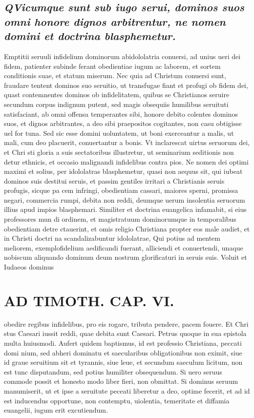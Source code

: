 \documentclass{article}
\begin{document}
\begin{pages}
\subsection*{\textit{\huge\textbf{Q}\normalsize Vicumque sunt sub iugo serui, dominos suos omni honore dignos arbitrentur, ne nomen domini et doctrina blasphemetur. }}\pstart Emptitii seruuli infidelium dominorum abidololatria conuersi, ad unius ueri dei fidem, patienter subinde ferant obedientiae iugum ac laborem, et sortem conditionis suae, et statum miserum. Nec quia ad Christum conuersi sunt, fraudare tentent dominos suo seruitio, ut transfugae fiant et profugi ob fidem dei, quast contemnentes dominos ob infidelitatem, quibus se Christianos seruire secundum corpus indignum putent, sed magis obsequiis humilibus seruituti satisfaciant, ab omni offensa temperantes sibi, honore debito colentes dominos suos, et dignos arbitrantes, a deo sibi praepositos cogitantes, non casu obtigisse uel for tuna. Sed sic esse domini uoluntatem, ut boni exerceantur a malis, ut mali, cum deo placuerit, conuertantur a bonis. Vt inclarescat uirtus seruorum dei, et Chri sti gloria a suis sectatoribus illustretur, ut seminarium seditionis non detur ethnicis, et occasio malignandi infidelibus contra pios. Ne nomen dei optimi maximi et solius, per idololatras blasphemetur, quasi non aequus sit, qui iubeat dominos suis destitui seruis, et passim gentiles irritari a Christianis seruis profugis, sicque pa cem infringi, obedientiam cassari, maiores sperni, promissa negari, commercia rumpi, debita non reddi, deumque uerum insolentia seruorum illius apud impios blasphemari. Similiter et doctrina euangelica infamabit, si eius professores mun di ordinem, et magistratuum dominorumque in temporalibus obedientiam detre ctauerint, et omis religio Christiana propter eos male audiet, et in Christi doctri na scandalizabuntur idololatrae, Qui potius ad mentem meliorem, exemplofidelium aedificandi fuerant, alliciendi et conuertendi, unaque nobiscum aliquando dominum deum nostrum glorificaturi in seruis suis. Voluit et Iudaeos dominus  \pend
\section*{AD TIMOTH. CAP. VI. }
\marginpar{[ p.529 ]}\pstart obedire regibus infidelibus, pro eis rogare, tributa pendere, pacem fouere. Et Chri stus Caesari iussit reddi, quae debita sunt Caesari. Petrus quoque in sua epistola multa huiusmodi. Aufert quidem baptismus, id est professio Christiana, peccati domi nium, sed abheri dominatu et saecularibus obligationibus non eximit, siue id graue seruitium sit et tyrannis, siue leue, et secundum saeculum licitum, non est tunc disputandum, sed potius humiliter obsequendum. Si uero seruus commode possit et honesto modo liber fieri, non obmittat. Si dominus seruum manumiserit, ut et ipse a seruitute peceati liberetur a deo, optime fecerit, et ad id est inducendus opportune, non contemptu, uiolentia, temeritate et diffamia euangelii, iugum erit excutiendum.  \pend
{}
{}

\end{pages}
\end{document}
